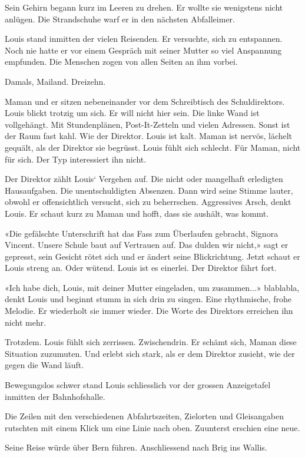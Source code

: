 Sein Gehirn begann kurz im Leeren zu drehen. Er wollte sie wenigstens
nicht anlügen. Die Strandschuhe warf er in den nächsten Abfalleimer.

Louis stand inmitten der vielen Reisenden. Er versuchte, sich zu
entspannen. Noch nie hatte er vor einem Gespräch mit seiner Mutter so
viel Anspannung empfunden. Die Menschen zogen von allen Seiten an ihm
vorbei.

Damals, Mailand. Dreizehn.

Maman und er sitzen nebeneinander vor dem Schreibtisch des
Schuldirektors. Louis blickt trotzig um sich. Er will nicht hier sein.
Die linke Wand ist vollgehängt. Mit Stundenplänen, Post-It-Zetteln und
vielen Adressen. Sonst ist der Raum fast kahl. Wie der Direktor. Louis
ist kalt. Maman ist nervös, lächelt gequält, als der Direktor sie
begrüsst. Louis fühlt sich schlecht. Für Maman, nicht für sich. Der Typ
interessiert ihn nicht.

Der Direktor zählt Louis` Vergehen auf. Die nicht oder mangelhaft
erledigten Hausaufgaben. Die unentschuldigten Absenzen. Dann wird seine
Stimme lauter, obwohl er offensichtlich versucht, sich zu beherrschen.
Aggressives Arsch, denkt Louis. Er schaut kurz zu Maman und hofft, dass
sie aushält, was kommt.

«Die gefälschte Unterschrift hat das Fass zum Überlaufen gebracht,
Signora Vincent. Unsere Schule baut auf Vertrauen auf. Das dulden wir
nicht,» sagt er gepresst, sein Gesicht rötet sich und er ändert seine
Blickrichtung. Jetzt schaut er Louis streng an. Oder wütend. Louis ist
es einerlei. Der Direktor fährt fort.

«Ich habe dich, Louis, mit deiner Mutter eingeladen, um zusammen...»
blablabla, denkt Louis und beginnt stumm in sich drin zu singen. Eine
rhythmische, frohe Melodie. Er wiederholt sie immer wieder. Die Worte
des Direktors erreichen ihn nicht mehr.

Trotzdem. Louis fühlt sich zerrissen. Zwischendrin. Er schämt sich,
Maman diese Situation zuzumuten. Und erlebt sich stark, als er dem
Direktor zusieht, wie der gegen die Wand läuft.

Bewegungslos schwer stand Louis schliesslich vor der grossen
Anzeigetafel inmitten der Bahnhofshalle.

Die Zeilen mit den verschiedenen Abfahrtszeiten, Zielorten und
Gleisangaben rutschten mit einem Klick um eine Linie nach oben.
Zuunterst erschien eine neue.

Seine Reise würde über Bern führen. Anschliessend nach Brig ins Wallis.


